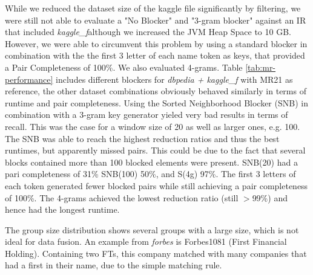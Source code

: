 \documentclass[11pt,titlepage,oneside,openany]{article}
\begin{document}
While we reduced the dataset size of the kaggle file significantly by filtering, we were still not able to evaluate a "No Blocker" and "3-gram blocker" against an IR that included \textit{kaggle\_f}although we increased the JVM Heap Space to 10 GB. However, we were able to circumvent this problem by using a standard blocker in combination with the the first 3 letter of each name token as keys, that provided a Pair Completeness of 100\%. We also evaluated 4-grams. Table \ref{tab:mr-performance} includes different blockers for \textit{dbpedia + kaggle\_f} with MR21 as reference, the other dataset combinations obviously behaved similarly in terms of runtime and pair completeness. Using the Sorted Neighborhood Blocker (SNB) in combination with a 3-gram key generator yieled very bad results in terms of recall. This was the case for a window size of 20 as well as larger ones, e.g. 100. The SNB was able to reach the highest reduction ratios and thus the best runtimes, but apparently missed pairs. This could be due to the fact that several blocks contained more than 100 blocked elements were present. SNB(20) had a pari completeness of 31\% SNB(100) 50\%, and S(4g) 97\%. The first 3 letters of each token generated fewer blocked pairs while still achieving a pair completeness of 100\%. The 4-grams achieved the lowest reduction ratio (still $>$99\%) and hence had the longest runtime.

The group size distribution shows several groups with a large size, which is not ideal for data fusion. An example from \textit{forbes} is Forbes1081 (First Financial Holding). Containing two FTs, this company matched with many companies that had a first in their name, due to the simple matching rule.
\end{document}
